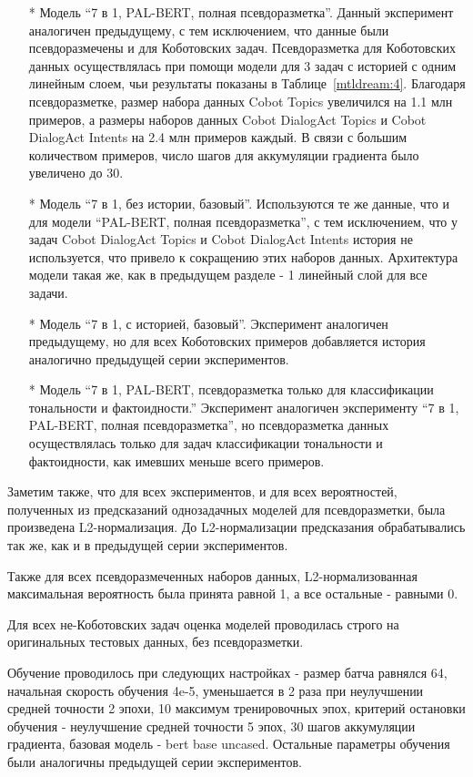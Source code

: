 \begin{itemize}
\item[*] Модель “7  в 1, PAL-BERT, полная псевдоразметка”. Данный эксперимент аналогичен предыдущему, с тем исключением, что данные были псевдоразмечены и для Коботовских задач.  Псевдоразметка для Коботовских данных осуществлялась при помощи модели для 3 задач с историей с одним линейным слоем, чьи результаты показаны в Таблице~\ref{mtldream:4}. Благодаря псевдоразметке, размер набора данных Cobot Topics увеличился на 1.1 млн примеров, а размеры наборов данных Cobot DialogAct Topics и Cobot DialogAct Intents на 2.4 млн примеров каждый. В связи с большим количеством примеров, число шагов для аккумуляции градиента было увеличено до 30.

\item[*] Модель “7 в 1, без истории, базовый”. Используются те же данные, что и для модели “PAL-BERT, полная псевдоразметка”, с тем исключением, что у задач Cobot DialogAct Topics и Cobot DialogAct Intents история не используется, что привело к сокращению этих наборов данных. Архитектура модели такая же, как в предыдущем разделе - 1 линейный слой для все задачи.

\item[*] Модель “7 в 1, с историей, базовый”. Эксперимент аналогичен предыдущему, но для всех Коботовских примеров добавляется история аналогично предыдущей серии экспериментов.

\item[*] Модель “7 в 1, PAL-BERT, псевдоразметка только для классификации тональности и фактоидности.” Эксперимент аналогичен эксперименту “7 в 1, PAL-BERT, полная псевдоразметка”, но псевдоразметка данных осуществлялась только для задач классификации тональности и фактоидности, как имевших меньше всего примеров.

\end{itemize}
Заметим также, что для всех экспериментов, и для всех вероятностей, полученных из предсказаний однозадачных моделей для псевдоразметки, была произведена L2-нормализация. До L2-нормализации предсказания обрабатывались так же, как и в предыдущей серии экспериментов.

Также для всех псевдоразмеченных наборов данных, L2-нормализованная максимальная вероятность была принята равной 1, а все остальные - равными 0.

Для всех не-Коботовских задач оценка моделей проводилась строго на оригинальных тестовых данных, без псевдоразметки.

Обучение проводилось при следующих настройках - размер батча равнялся 64, начальная скорость обучения 4e-5, уменьшается в 2 раза при неулучшении средней точности 2 эпохи, 10 максимум тренировочных эпох, критерий остановки обучения - неулучшение средней точности 5 эпох, 30 шагов аккумуляции градиента, базовая модель - bert base uncased. Остальные параметры обучения были аналогичны предыдущей серии экспериментов.

